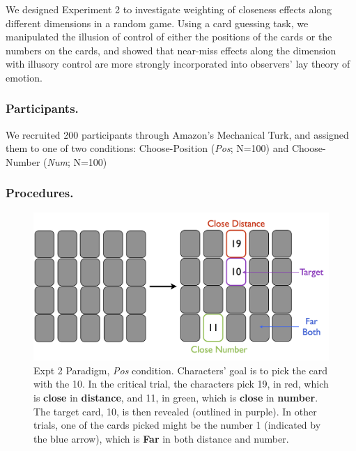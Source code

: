 \documentclass[10pt,letterpaper]{article}
\begin{document}
We designed Experiment 2 to investigate weighting of closeness effects along different dimensions in a random game. Using a card guessing task, we manipulated the illusion of control of either the positions of the cards or the numbers on the cards, and showed that near-miss effects along the dimension with illusory control are more strongly incorporated into observers' lay theory of emotion. 


\subsubsection{Participants.} We recruited 200 participants through Amazon's Mechanical Turk, and assigned them to one of two conditions: Choose-Position (\textit{Pos}; N=100) and Choose-Number (\textit{Num}; N=100)



\subsubsection{Procedures.} 

\begin{figure}[htb!]
\includegraphics[width=\columnwidth]{images/card_paradigm.png}
\caption{ Expt 2 Paradigm, \textit{Pos} condition. Characters' goal is to pick the card with the 10. In the critical trial, the characters pick 19, in red, which is \textbf{close} in \textbf{distance}, and 11, in green, which is \textbf{close} in \textbf{number}. The target card, 10, is then revealed (outlined in purple). In other trials, one of the cards picked might be the number 1 (indicated by the blue arrow), which is \textbf{Far} in both distance and number. }
\label{Expt2ParadigmFig}
\end{figure}
\end{document}
